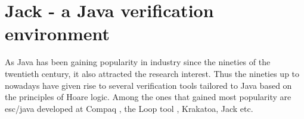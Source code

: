 \section{Jack - a Java verification environment} \label{javaVerif:jack} 
As Java has been gaining popularity in industry since the nineties of the twentieth century,
it also attracted the research interest.   
Thus the nineties up to nowadays have given rise to several verification tools tailored to Java
 based on the principles of Hoare logic. Among the ones that gained most popularity are
esc/java developed at Compaq \cite{escjava}, the Loop tool \cite{jacobs03java}, Krakatoa, Jack \cite{BRL-JACK} etc.
